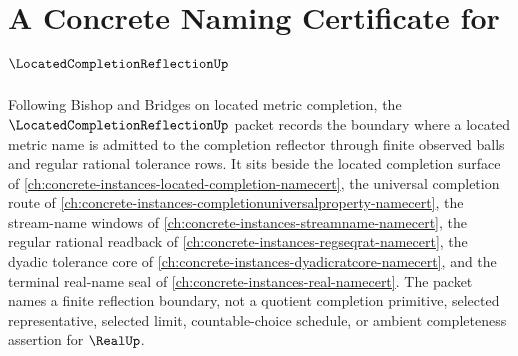 \chapter{A Concrete Naming Certificate for $\LocatedCompletionReflectionUp$}
\label{ch:concrete-instances-located-completion-reflection-namecert}

Following Bishop and Bridges on located metric completion, the $\LocatedCompletionReflectionUp$ packet records the boundary where a located metric name is admitted to the completion reflector through finite observed balls and regular rational tolerance rows. It sits beside the located completion surface of \autoref{ch:concrete-instances-located-completion-namecert}, the universal completion route of \autoref{ch:concrete-instances-completionuniversalproperty-namecert}, the stream-name windows of \autoref{ch:concrete-instances-streamname-namecert}, the regular rational readback of \autoref{ch:concrete-instances-regseqrat-namecert}, the dyadic tolerance core of \autoref{ch:concrete-instances-dyadicratcore-namecert}, and the terminal real-name seal of \autoref{ch:concrete-instances-real-namecert}. The packet names a finite reflection boundary, not a quotient completion primitive, selected representative, selected limit, countable-choice schedule, or ambient completeness assertion for $\RealUp$.

